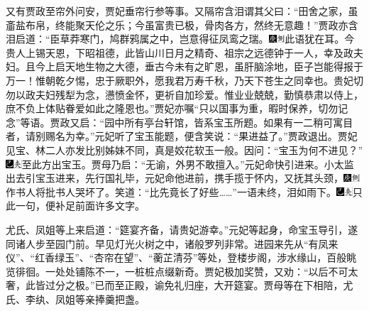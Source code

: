 又有贾政至帘外问安，贾妃垂帘行参等事。又隔帘含泪谓其父曰：``田舍之家，虽齑盐布帛，终能聚天伦之乐；今虽富贵已极，骨肉各方，然终无意趣！''贾政亦含泪启道：``臣草莽寒门，鸠群鸦属之中，岂意得征凤鸾之瑞。{\includegraphics[width=3mm]{../Images/00004}\includegraphics[width=3mm]{../Images/00011}\footnotesize \kaishu 此语犹在耳。}今贵人上锡天恩，下昭祖德，此皆山川日月之精奇、祖宗之远德钟于一人，幸及政夫妇。且今上启天地生物之大德，垂古今未有之旷恩，虽肝脑涂地，臣子岂能得报于万一！惟朝乾夕惕，忠于厥职外，愿我君万寿千秋，乃天下苍生之同幸也。贵妃切勿以政夫妇残犁为念，懑愤金怀，更祈自加珍爱。惟业业兢兢，勤慎恭肃以侍上，庶不负上体贴眷爱如此之隆恩也。''贾妃亦嘱``只以国事为重，暇时保养，切勿记念''等语。贾政又启：``园中所有亭台轩馆，皆系宝玉所题。如果有一二稍可寓目者，请别赐名为幸。''元妃听了宝玉能题，便含笑说：``果进益了。''贾政退出。贾妃见宝、林二人亦发比别姊妹不同，真是姣花软玉一般。因问：``宝玉为何不进见？''{\includegraphics[width=3mm]{../Images/00003}\includegraphics[width=3mm]{../Images/00012}\footnotesize \kaishu 至此方出宝玉。}贾母乃启：``无谕，外男不敢擅入。''元妃命快引进来。小太监出去引宝玉进来，先行国礼毕，元妃命他进前，携手揽于怀内，又抚其头颈，{\includegraphics[width=3mm]{../Images/00004}\includegraphics[width=3mm]{../Images/00011}\footnotesize \kaishu 作书人将批书人哭坏了。}笑道：``比先竟长了好些\ldots{}\ldots{}''一语未终，泪如雨下。{\includegraphics[width=3mm]{../Images/00003}\includegraphics[width=3mm]{../Images/00012}\footnotesize \kaishu 只此一句，便补足前面许多文字。}

尤氏、凤姐等上来启道：``筵宴齐备，请贵妃游幸。''元妃等起身，命宝玉导引，遂同诸人步至园门前。早见灯光火树之中，诸般罗列非常。进园来先从``有凤来仪''、``红香绿玉''、``杏帘在望''、``蘅芷清芬''等处，登楼步阁，涉水缘山，百般眺览徘徊。一处处铺陈不一，一桩桩点缀新奇。贾妃极加奖赞，又劝：``以后不可太奢，此皆过分之极。''已而至正殿，谕免礼归座，大开筵宴。贾母等在下相陪，尤氏、李纨、凤姐等亲捧羹把盏。

